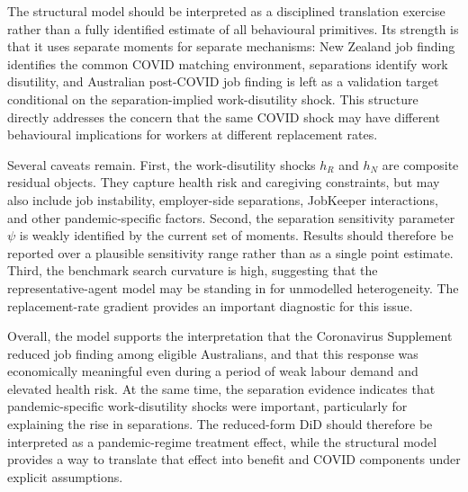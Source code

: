 The structural model should be interpreted as a disciplined translation exercise rather than a fully identified estimate of all behavioural primitives. Its strength is that it uses separate moments for separate mechanisms: New Zealand job finding identifies the common COVID matching environment, separations identify work disutility, and Australian post-COVID job finding is left as a validation target conditional on the separation-implied work-disutility shock. This structure directly addresses the concern that the same COVID shock may have different behavioural implications for workers at different replacement rates.

Several caveats remain. First, the work-disutility shocks $h_R$ and $h_N$ are composite residual objects. They capture health risk and caregiving constraints, but may also include job instability, employer-side separations, JobKeeper interactions, and other pandemic-specific factors. Second, the separation sensitivity parameter $\psi$ is weakly identified by the current set of moments. Results should therefore be reported over a plausible sensitivity range rather than as a single point estimate. Third, the benchmark search curvature is high, suggesting that the representative-agent model may be standing in for unmodelled heterogeneity. The replacement-rate gradient provides an important diagnostic for this issue.

Overall, the model supports the interpretation that the Coronavirus Supplement reduced job finding among eligible Australians, and that this response was economically meaningful even during a period of weak labour demand and elevated health risk. At the same time, the separation evidence indicates that pandemic-specific work-disutility shocks were important, particularly for explaining the rise in separations. The reduced-form DiD should therefore be interpreted as a pandemic-regime treatment effect, while the structural model provides a way to translate that effect into benefit and COVID components under explicit assumptions.
